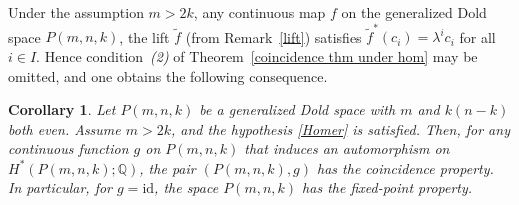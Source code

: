 \documentclass{amsart}
\newtheorem{corollary}[theorem]{Corollary}
\begin{document}
	Under the assumption $m>2k$, any continuous map $f$ on the generalized Dold space $P(m,n,k)$, the lift $\tilde f$ (from Remark~\ref{lift}) satisfies $\tilde f^{*}(c_i)=\lambda^ic_i$ for all $i\in I$. Hence %
condition~\textit{(2)} of %
Theorem~\ref{coincidence thm under hom} may be omitted, and one obtains the following consequence.
	\begin{corollary}
		Let $P(m,n,k)$ be a generalized Dold space with $m$ and $k(n-k)$ both even. Assume $m>2k$, and the hypothesis \eqref{Homer} is satisfied.
		Then, for %
any continuous function %
$g$ on $P(m,n,k)$ that induces an automorphism %
on $H^*(P(m,n,k);\mathbb{Q})$, the %
pair $(P(m,n,k),g)$ has the coincidence %
property. \\ In particular, for %
$g=\mathrm{id}$, the space $P(m,n,k)$ has the fixed-point property.
	\end{corollary}
\end{document}
